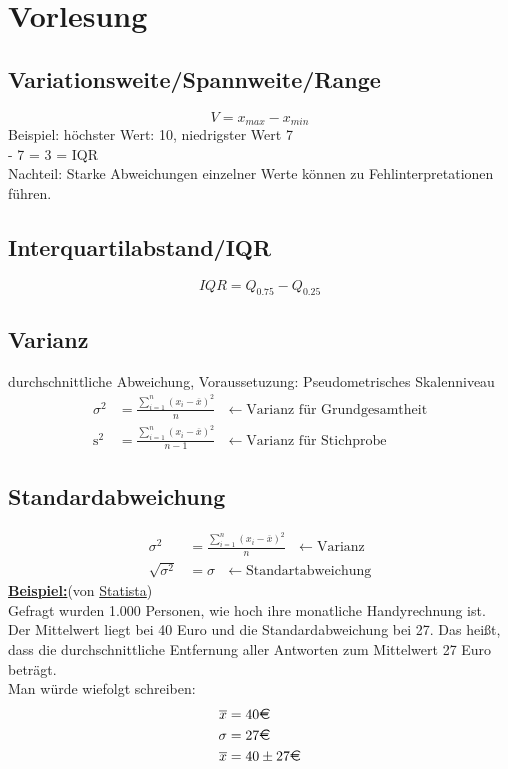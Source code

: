 \section{Vorlesung}

\subsection{Variationsweite/Spannweite/Range}
\begin{equation*}
    V = x_{max} - x_{min}
\end{equation*}
Beispiel: höchster Wert: 10, niedrigster Wert 7 \\ - 7 = 3 = IQR\\
Nachteil: Starke Abweichungen einzelner Werte können zu Fehlinterpretationen führen.

\subsection{Interquartilabstand/IQR}
\begin{equation*}
    IQR = Q_{0.75} - Q_{0.25}
\end{equation*}

\subsection{Varianz}
\textrightarrow durchschnittliche Abweichung, Voraussetuzung: Pseudometrisches Skalenniveau
\begin{align*}
    \sigma^{2}& = \frac{\sum_{i=1}^{n}(x_{i}-\overline{x})^2}{n}~~~\longleftarrow \textrm{Varianz für Grundgesamtheit}\\
    \textrm{s}^{2}& = \frac{\sum_{i=1}^{n}(x_{i}-\overline{x})^2}{n-1}~~~\longleftarrow \textrm{Varianz für Stichprobe}
\end{align*}

\subsection{Standardabweichung}
\begin{align*}
    \sigma^{2}& = \frac{\sum_{i=1}^{n}(x_{i}-\overline{x})^2}{n}~~~\longleftarrow \textrm{Varianz}\\
    \sqrt{\sigma^{2}}& = \sigma~~~\longleftarrow \textrm{Standartabweichung}
\end{align*}
\textbf{\underline{Beispiel:}}\hfill(von \href{https://de.statista.com/statistik/lexikon/definition/126/standardabweichung/#:~:text=Definition%20Standardabweichung,Auspr%C3%A4gungen%20eines%20Merkmals%20vom%20Durchschnitt.}{Statista})\\
Gefragt wurden 1.000 Personen, wie hoch ihre monatliche Handyrechnung ist. Der Mittelwert liegt bei 40 Euro und die Standardabweichung bei 27. Das heißt, dass die durchschnittliche Entfernung aller Antworten zum Mittelwert 27 Euro beträgt.\\
Man würde wiefolgt schreiben:
\begin{align*}
  \overline{x}&= 40\textrm{\EUR}\\
  \sigma&= 27\textrm{\EUR}\\
  \overline{x}&= 40\pm27\textrm{\EUR}
\end{align*}

